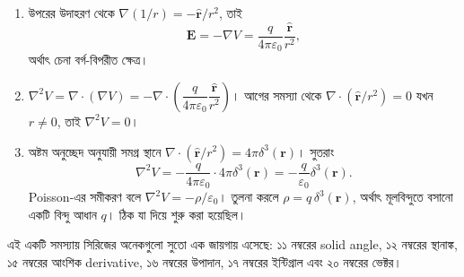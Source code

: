 \documentclass[11pt]{article}
\begin{document}
\begin{sol}
\begin{enumerate}
  \item উপরের উদাহরণ থেকে $\nabla\left( 1/r \right) =
        -\hat{\mathbf{r}}/r^{2}$, তাই
        \[
          \mathbf{E} = -\nabla V
          = \frac{q}{4\pi\varepsilon_{0}}\frac{\hat{\mathbf{r}}}{r^{2}} ,
        \]
        অর্থাৎ চেনা বর্গ-বিপরীত ক্ষেত্র।
  \item $\nabla^{2}V = \nabla\cdot(\nabla V)
        = -\nabla\cdot\left( \dfrac{q}{4\pi\varepsilon_{0}}
        \dfrac{\hat{\mathbf{r}}}{r^{2}} \right)$। আগের সমস্যা থেকে
        $\nabla\cdot\left( \hat{\mathbf{r}}/r^{2} \right) = 0$ যখন
        $r \neq 0$, তাই $\nabla^{2}V = 0$।
  \item অষ্টম অনুচ্ছেদ অনুযায়ী সমগ্র স্থানে
        $\nabla\cdot\left( \hat{\mathbf{r}}/r^{2} \right)
        = 4\pi\delta^{3}(\mathbf{r})$। সুতরাং
        \[
          \nabla^{2}V = -\frac{q}{4\pi\varepsilon_{0}}
          \cdot 4\pi\delta^{3}(\mathbf{r})
          = -\frac{q}{\varepsilon_{0}}\delta^{3}(\mathbf{r}) .
        \]
        Poisson-এর সমীকরণ বলে $\nabla^{2}V = -\rho/\varepsilon_{0}$। তুলনা
        করলে $\rho = q\,\delta^{3}(\mathbf{r})$, অর্থাৎ মূলবিন্দুতে বসানো
        একটি বিন্দু আধান $q$। ঠিক যা দিয়ে শুরু করা হয়েছিল।
\end{enumerate}
এই একটি সমস্যায় সিরিজের অনেকগুলো সুতো এক জায়গায় এসেছে: ১১ নম্বরের solid
angle, ১২ নম্বরের স্থানাঙ্ক, ১৫ নম্বরের আংশিক derivative, ১৬ নম্বরের
উপাদান, ১৭ নম্বরের ইন্টিগ্রাল এবং ২০ নম্বরের ভেক্টর।
\end{sol}
\end{document}
